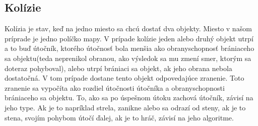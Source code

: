 \subsection{Kolízie}\label{kolizie}
Kolízia je stav, keď na jedno miesto sa chcú dostať dva objekty. Miesto v našom príprade je jedno políčko mapy. V prípade kolízie jeden alebo druhý objekt utrpí a to buď útočník, ktorého útočnosť bola menšia ako obranyschopnosť brániaceho sa objektu(teda neprenikol obranou, ako výsledok sa mu zmení smer, ktorým sa doteraz pohyboval), alebo utrpí brániaci sa objekt, ak jeho obrana nebola dostatočná. V tom prípade dostane tento objekt odpovedajúce zranenie. Toto zranenie sa vypočíta ako rozdiel útočnosti útočníka a obranyschopnosti brániaceho sa objektu. To, ako sa po úspešnom útoku zachová útočník, závisí na jeho type. Ak je to napríklad strela, zanikne alebo sa odrazí od steny, ak je to stena, svojím pohybom útočí ďalej, ak je to hráč, závisí na jeho algoritme.
